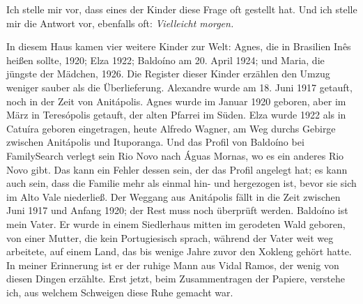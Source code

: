 \documentclass[
  ngerman,
  11pt,
  openany]{book}
\begin{document}
Ich stelle mir vor, dass eines der Kinder diese Frage oft gestellt hat.
Und ich stelle mir die Antwort vor, ebenfalls oft: \emph{Vielleicht
morgen.}

In diesem Haus kamen vier weitere Kinder zur Welt: Agnes, die in
Brasilien Inês heißen sollte, 1920; Elza 1922; Baldoíno am 20. April
1924; und Maria, die jüngste der Mädchen, 1926. Die Register dieser
Kinder erzählen den Umzug weniger sauber als die Überlieferung.
Alexandre wurde am 18. Juni 1917 getauft, noch in der Zeit von
Anitápolis. Agnes wurde im Januar 1920 geboren, aber im März in
Teresópolis getauft, der alten Pfarrei im Süden. Elza wurde 1922 als in
Catuíra geboren eingetragen, heute Alfredo Wagner, am Weg durchs Gebirge
zwischen Anitápolis und Ituporanga. Und das Profil von Baldoíno bei
FamilySearch verlegt sein Rio Novo nach Águas Mornas, wo es ein anderes
Rio Novo gibt. Das kann ein Fehler dessen sein, der das Profil angelegt
hat; es kann auch sein, dass die Familie mehr als einmal hin- und
hergezogen ist, bevor sie sich im Alto Vale niederließ. Der Weggang aus
Anitápolis fällt in die Zeit zwischen Juni 1917 und Anfang 1920; der
Rest muss noch überprüft werden. Baldoíno ist mein Vater. Er wurde in
einem Siedlerhaus mitten im gerodeten Wald geboren, von einer Mutter,
die kein Portugiesisch sprach, während der Vater weit weg arbeitete, auf
einem Land, das bis wenige Jahre zuvor den Xokleng gehört hatte. In
meiner Erinnerung ist er der ruhige Mann aus Vidal Ramos, der wenig von
diesen Dingen erzählte. Erst jetzt, beim Zusammentragen der Papiere,
verstehe ich, aus welchem Schweigen diese Ruhe gemacht war.
\end{document}
